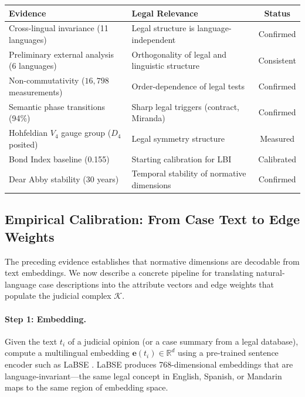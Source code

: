 \documentclass[12pt]{article}
\theoremstyle{definition}
\theoremstyle{remark}
\newcommand{\R}{\mathbb{R}}
\begin{document}
\begin{center}
\begin{tabular}{llc}
\toprule
\textbf{Evidence} & \textbf{Legal Relevance} & \textbf{Status} \\
\midrule
Cross-lingual invariance (11 languages) & Legal structure is language-independent & Confirmed \\
Preliminary external analysis (6 languages) & Orthogonality of legal and linguistic structure & Consistent \\
Non-commutativity ($16{,}798$ measurements) & Order-dependence of legal tests & Confirmed \\
Semantic phase transitions (94\%) & Sharp legal triggers (contract, Miranda) & Confirmed \\
Hohfeldian $V_4$ gauge group ($D_4$ posited) & Legal symmetry structure & Measured \\
Bond Index baseline (0.155) & Starting calibration for LBI & Calibrated \\
Dear Abby stability (30 years) & Temporal stability of normative dimensions & Confirmed \\
\bottomrule
\end{tabular}
\end{center}

\subsection{Empirical Calibration: From Case Text to Edge Weights}
\label{sec:calibration}

The preceding evidence establishes that normative dimensions are decodable from text embeddings.  We now describe a concrete pipeline for translating natural-language case descriptions into the attribute vectors and edge weights that populate the judicial complex $\mathcal{K}$.

\paragraph{Step 1: Embedding.}  Given the text $t_i$ of a judicial opinion (or a case summary from a legal database), compute a multilingual embedding $\mathbf{e}(t_i) \in \R^d$ using a pre-trained sentence encoder such as LaBSE \cite{feng2022}.  LaBSE produces 768-dimensional embeddings that are language-invariant---the same legal concept in English, Spanish, or Mandarin maps to the same region of embedding space.
\end{document}
